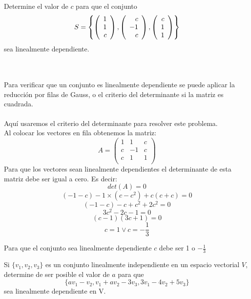 \begin{enumerate}
\begin{prob}[]
\end{prob}


\begin{prop}[]

Determine el valor de $c$ para que el conjunto $$S=\left\lbrace  \left( \begin{array}{r} 1\\ 1\\ c \end{array} \right) , \left( \begin{array}{r} c\\ -1\\ c \end{array} \right) , \left( \begin{array}{r} c\\ 1\\ 1 \end{array} \right) \right\rbrace $$ sea linealmente dependiente.
\end{prop}
~\\
\sol
~\\
Para verificar que un conjunto es linealmente dependiente se puede aplicar la reducción por filas de Gauss, o el criterio del determinante si la matriz es cuadrada.
~\\~\\
Aquí usaremos el criterio del determinante para resolver este problema.
~\\
Al colocar los vectores en fila obtenemos la matriz:
~\\
 $$A=\left(\begin{array}{rrr}
1&1&c\\
c&-1&c\\
c&1&1\\
\end{array}\right)$$
Para que los vectores sean linealmente dependientes el determinante de esta matriz debe ser igual a cero. Es decir:~\\
\[det(A)=0\]
\[(-1-c)-1\times(c-c^2)+c(c+c)=0\]
\[(-1-c)-c+c^2+2c^2=0\]
\[3c^2-2c-1=0\]
\[(c-1)(3c+1)=0\]
\[c=1 \vee c=-\frac{1}{3}\]

Para que el conjunto sea linealmente dependiente $c$ debe ser 1 o $-\frac{1}{3}$


\begin{prob}[]

Si $\{v_1, v_2, v_3\} $ es un conjunto linealmente independiente en un espacio vectorial $V$, determine de ser posible el valor de $a$ para que $$\{av_1-v_2, v_1+av_2-3v_3, 3v_1 -4v_2+5v_3 \}$$ sea linealmente dependiente en V.
\end{prob}





\end{enumerate}

